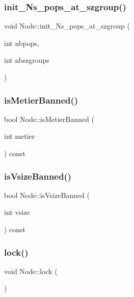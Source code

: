 \subsubsection{\texorpdfstring{init\_Ns\_pops\_at\_szgroup()}{init\_Ns\_pops\_at\_szgroup()}}
{\footnotesize\ttfamily void Node\+::init\+\_\+\+Ns\+\_\+pops\+\_\+at\+\_\+szgroup (\begin{DoxyParamCaption}\item[{int}]{nbpops,  }\item[{int}]{nbszgroups }\end{DoxyParamCaption})}

\mbox{\label{class_node_a559e525ebf950f74b173c59ef00d2f1a}} 
\subsubsection{\texorpdfstring{isMetierBanned()}{isMetierBanned()}}
{\footnotesize\ttfamily bool Node\+::is\+Metier\+Banned (\begin{DoxyParamCaption}\item[{int}]{metier }\end{DoxyParamCaption}) const\hspace{0.3cm}{\ttfamily [inline]}}

\mbox{\label{class_node_abe46b40cd4f6cc7d2aec9f5194a25a39}} 
\subsubsection{\texorpdfstring{isVsizeBanned()}{isVsizeBanned()}}
{\footnotesize\ttfamily bool Node\+::is\+Vsize\+Banned (\begin{DoxyParamCaption}\item[{int}]{vsize }\end{DoxyParamCaption}) const\hspace{0.3cm}{\ttfamily [inline]}}

\mbox{\label{class_node_ad31d57f72ea132348b73b13399c0f243}} 
\subsubsection{\texorpdfstring{lock()}{lock()}}
{\footnotesize\ttfamily void Node\+::lock (\begin{DoxyParamCaption}{ }\end{DoxyParamCaption})\hspace{0.3cm}{\ttfamily [inline]}}

